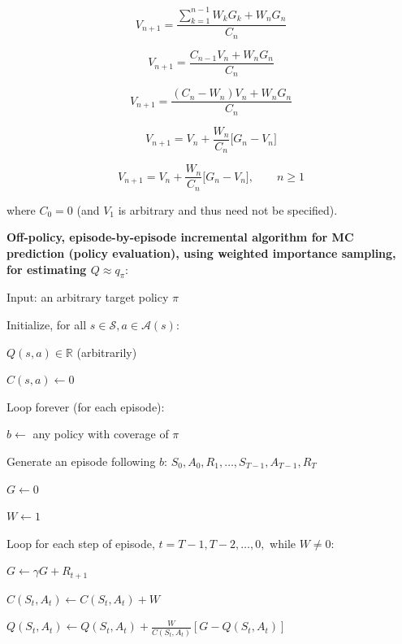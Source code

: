 \documentclass{article}
\begin{document}
$$
V_{n+1} = \frac{\sum_{k=1}^{n-1} W_k G_k + W_n G_n}{C_n}
$$

$$
V_{n+1} = \frac{C_{n-1} V_n + W_n G_n}{C_n}
$$

$$
V_{n+1} = \frac{(C_n - W_n) V_n + W_n G_n}{C_n}
$$

$$
V_{n+1} = V_n + \frac{W_n}{C_n} \Big[ G_n - V_n \Big]
$$

$$
V _ { n + 1 } = V _ { n } + \frac { W _ { n } } { C _ { n } } \Big [ G _ { n } - V _ { n } \Big ] , \qquad n \geq 1
$$

where $C _ { 0 } = 0$ (and $V _ { 1 }$ is arbitrary and thus need not be specified).

\textbf{Off-policy, episode-by-episode incremental algorithm for MC prediction (policy evaluation), using weighted importance sampling, for estimating $Q \approx q _ { \pi }$}:

Input: an arbitrary target policy $ \pi $

Initialize, for all $s \in \mathcal { S } , a \in \mathcal { A } ( s )$:

\hspace{.5cm} $Q ( s , a ) \in \mathbb { R }$ (arbitrarily)

\hspace{.5cm} $C ( s , a ) \gets 0$

Loop forever (for each episode):

\hspace{.5cm} $ b \gets $ any policy with coverage of $\pi$

\hspace{.5cm} Generate an episode following $ b $: $S _ { 0 } , A _ { 0 } , R _ { 1 } , \ldots , S _ { T - 1 } , A _ { T - 1 } , R _ { T }$

\hspace{.5cm} $G \gets 0$

\hspace{.5cm} $W \leftarrow 1$

\hspace{.5cm} Loop for each step of episode, $t = T   -   1 , T   -   2 , \ldots , 0 ,$ while $W \neq 0 :$

\hspace{1cm} $G \leftarrow \gamma G + R _ { t + 1 }$

\hspace{1cm} $C ( S _ { t } , A _ { t } ) \leftarrow C ( S _ { t } , A _ { t } ) + W$

\hspace{1cm} $Q ( S _ { t } , A _ { t } ) \leftarrow Q ( S _ { t } , A _ { t } ) + \frac { W } { C ( S _ { t } , A _ { t } ) } \left[ G - Q ( S _ { t } , A _ { t } ) \right]$
\end{document}

